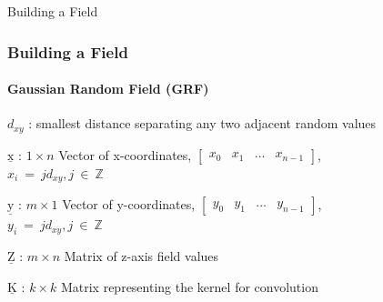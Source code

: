 \documentclass[professionalfont,10pt]{beamer}
\begin{document}
	\begin{frame}[t]{Building a Field}
		\frametitle{Building a Field}
		\framesubtitle{Gaussian Random Field (GRF)}
		\hskip-0.75cm
		\begin{minipage}[t]{0.2\linewidth}\vspace{-0.5cm}
			\tiny\tableofcontents[currentsection,currentsubsection,hideothersubsections,subsectionstyle=show/shaded]
		\end{minipage}
		\hfill%
		\begin{minipage}[t]{0.86\linewidth}\vspace{-0.5cm}
			\begin{flushleft}
				$d_{xy}$ : smallest distance separating any two adjacent random values 
				
				$\underline{\text{x}}$ : $1 \times n$ Vector of x-coordinates, $\left[\begin{array}{cccc}x_0 & x_1 & \dots & x_{n-1}\end{array}\right]$,\\
				$ x_i~=~jd_{xy}, j~\in~\mathbb{Z}$
				
				$\underline{\text{y}}$ : $m \times 1$ Vector of y-coordinates, $\left[\begin{array}{cccc}y_0 & y_1 & \dots & y_{n-1}\end{array}\right]$,\\
				$ y_i~=~jd_{xy}, j~\in~\mathbb{Z}$

				
				$\underline{\text{Z}}$ : $m \times n$ Matrix of z-axis field values 
				
				$\underline{\text{K}}$ : $k \times k$ Matrix representing the kernel for convolution
	
			\end{flushleft}
		\end{minipage}
		\vfill%
		
	\end{frame}
	
\end{document}

